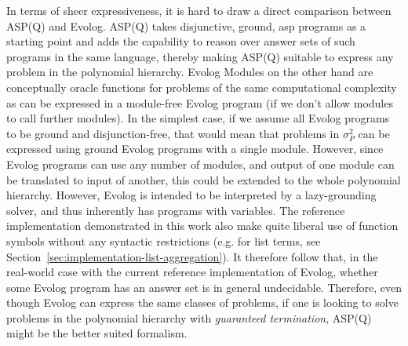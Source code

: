 In terms of sheer expressiveness, it is hard to draw a direct comparison between ASP(Q) and Evolog. ASP(Q) takes disjunctive, ground, \gls{asp} programs as a starting point and adds the capability to reason over answer sets of such programs in the same language, thereby making ASP(Q) suitable to express any problem in the polynomial hierarchy. Evolog Modules on the other hand are conceptually oracle functions for problems of the same computational complexity as can be expressed in a module-free Evolog program (if we don't allow modules to call further modules). In the simplest case, if we assume all Evolog programs to be ground and disjunction-free, that would mean that problems in $\sigma^2_P$ can be expressed using ground Evolog programs with a single module. However, since Evolog programs can use any number of modules, and output of one module can be translated to input of another, this could be extended to the whole polynomial hierarchy.
However, Evolog is intended to be interpreted by a lazy-grounding solver, and thus inherently has programs with variables. The reference implementation demonstrated in this work also make quite liberal use of function symbols without any syntactic restrictions (e.g. for list terms, see Section~\ref{sec:implementation-list-aggregation}). It therefore follow that, in the real-world case with the current reference implementation of Evolog, whether some Evolog program has an answer set is in general undecidable. Therefore, even though Evolog can express the same classes of problems, if one is looking to solve problems in the polynomial hierarchy with \emph{guaranteed termination}, ASP(Q) might be the better suited formalism.